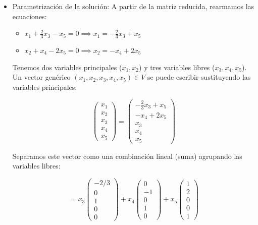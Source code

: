 \documentclass[11pt,spanish]{article}
\begin{document}
\begin{itemize}
\begin{enumerate}
$$F_3 \leftarrow F_3 - 3F_2 \implies (0, 0, 0, 0, 0) .$$

Luego multiplicamos la Fila 2 por $-1$ para dejar el pivote positivo:

$$F_2 \leftarrow -F_2 \implies (0, 1, 0, 1, -2) .$$

de manera que la matriz escalonada reducida final es:

$$\begin{pmatrix}
1 & 0 & 2/3 & 0 & -1 \\
0 & 1 & 0 & 1 & -2 \\
0 & 0 & 0 & 0 & 0
\end{pmatrix}$$

\end{enumerate}

\item Parametrización de la solución:
A partir de la matriz reducida, rearmamos las ecuaciones:

\begin{itemize}
\item $x_1 + \frac{2}{3}x_3 - x_5 = 0 \implies x_1 = -\frac{2}{3}x_3 + x_5$
\item $x_2 + x_4 - 2x_5 = 0 \implies x_2 = -x_4 + 2x_5$
\end{itemize}

Tenemos dos variables principales ($x_1, x_2$) y tres variables libres ($x_3, x_4, x_5$).
Un vector genérico $(x_1, x_2, x_3, x_4, x_5) \in V$ se puede escribir sustituyendo las variables principales:

$$\begin{pmatrix} x_1 \\ x_2 \\ x_3 \\ x_4 \\ x_5 \end{pmatrix} =
\begin{pmatrix} -\frac{2}{3}x_3 + x_5 \\ -x_4 + 2x_5 \\ x_3 \\ x_4 \\ x_5 \end{pmatrix}$$

Separamos este vector como una combinación lineal (suma) agrupando las variables libres:

$$= x_3 \begin{pmatrix} -2/3 \\ 0 \\ 1 \\ 0 \\ 0 \end{pmatrix} + 
x_4 \begin{pmatrix} 0 \\ -1 \\ 0 \\ 1 \\ 0 \end{pmatrix} + 
x_5 \begin{pmatrix} 1 \\ 2 \\ 0 \\ 0 \\ 1 \end{pmatrix}$$


\end{itemize}
\end{document}
